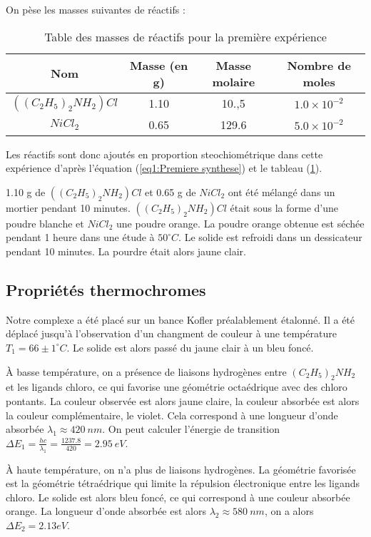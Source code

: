 \documentclass[12pt]{article}
\begin{document}
On pèse les masses suivantes de réactifs :
\begin{table}[h!]
    \begin{center}
        \begin{tabular}{|c|c|c|c|}
            \hline
            Nom & Masse (en g) & Masse molaire & Nombre de moles \\
            \hline
            $((C_2H_5)_2NH_2)Cl$ & 1.10 & 10.,5 & $1.0\times 10^{-2}$ \\
            \hline
            $NiCl_2$ & 0.65 & 129.6 & $5.0 \times 10^{-2}$ \\
            \hline
        \end{tabular}
    \end{center}
    \caption{Table des masses de réactifs pour la première expérience}
    \label{tab1:masse1}
\end{table}

Les réactifs sont donc ajoutés en proportion steochiométrique dans cette expérience d'après l'équation (\ref{eq1:Premiere synthese}) et le tableau (\ref{tab1:masse1}).

1.10 g de $((C_2H_5)_2NH_2)Cl$ et 0.65 g de $NiCl_2$ ont été mélangé dans un mortier pendant 10 minutes. 
$((C_2H_5)_2NH_2)Cl$ était sous la forme d'une poudre blanche et $NiCl_2$ une poudre orange.
La poudre orange obtenue est séchée pendant 1 heure dans une étude à $50^\circ C$.
Le solide est refroidi dans un dessicateur pendant 10 minutes. La pourdre était alors jaune clair.

\subsection{Propriétés thermochromes}
Notre complexe a été placé sur un bance Kofler préalablement étalonné. 
Il a été déplacé jusqu'à l'observation d'un changment de couleur à une température $T_1=66\pm 1^\circ C$.
Le solide est alors passé du jaune clair à un bleu foncé.

À basse température, on a présence de liaisons hydrogènes entre $(C_2H_5)_2NH_2$ et les ligands chloro, ce qui favorise une géométrie octaédrique avec des chloro pontants.
La couleur observée est alors jaune claire, la couleur absorbée est alors la couleur complémentaire, le violet.
Cela correspond à une longueur d'onde absorbée $\lambda_1\approx 420 \ nm$. 
On peut calculer l'énergie de transition $\Delta E_1 =\frac{hc}{\lambda_1}=\frac{1237.8}{420}=2.95 \ eV$.

À haute température, on n'a plus de liaisons hydrogènes.
La géométrie favorisée est la géométrie tétraédrique qui limite la répulsion électronique entre les ligands chloro.
Le solide est alors bleu foncé, ce qui correspond à une couleur absorbée orange.
La longueur d'onde absorbée est alors $\lambda_2\approx 580 \ nm$, on a alors $\Delta E_2=2.13 eV$.
\end{document}
